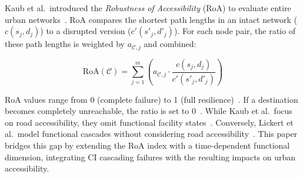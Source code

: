 Kaub et al.\ introduced the \textit{Robustness of Accessibility} (RoA) to evaluate entire urban networks~\cite{kaub2024}.
RoA compares the shortest path lengths in an intact network ($c(s_j,d_j)$) to a disrupted version ($c'(s'_j,d'_j)$). For each node pair, the ratio of these path lengths is weighted by $a_{\mathcal{C},j}$ and combined:

\begin{equation}
    \text{RoA}(\mathcal{C}) = \sum_{j=1}^{m} \left( a_{\mathcal{C},j} \cdot \frac{c(s_j,d_j)}{c'(s'_j, d'_j)} \right) \label{eq:old_roa}
\end{equation}

\noindent
RoA values range from 0 (complete failure) to 1 (full resilience)~\cite{kaub2024}.
If a destination becomes completely unreachable, the ratio is set to 0~\cite{kaub2024}.
While Kaub et al.\ focus on road accessibility, they omit functional facility states~\cite{kaub2024}.
Conversely, Lickert et al.\ model functional cascades without considering road accessibility~\cite{lickert2024}.
This paper bridges this gap by extending the RoA index with a time-dependent functional dimension, integrating CI cascading failures with the resulting impacts on urban accessibility.